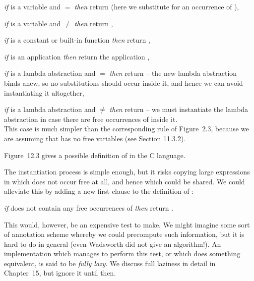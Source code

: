 \begin{numbered}
    \item \textit{if}  is a variable  and  $=$  \textit{then} return  (here we substitute
     for an occurrence of ),
    \item \textit{if}  is a variable  and  $\neq$  \textit{then} return ,
    \item \textit{if}  is a constant or built-in function \textit{then} return ,
    \item \textit{if}  is an application  \textit{then} return the application
    ,
    \item \textit{if}  is a lambda abstraction  and  $=$  \textit{then} return  -- the
    new lambda abstraction binds  anew, so no substitutions should occur
    inside it, and hence we can avoid instantiating it altogether,
    \item \textit{if}  is a lambda abstraction  and  $\neq$  \textit{then} return
     -- we must instantiate the lambda abstraction
    in case there are free occurrences of  inside it.\\
    This case is much simpler than the corresponding rule of Figure~2.3,
    because we are assuming that  has no free variables (see Section
    11.3.2).
\end{numbered}

Figure~12.3 gives a possible definition of  in the C language.

The instantiation process is simple enough, but it risks copying large
expressions in which  does not occur free at all, and hence which could be
shared. We could alleviate this by adding a new first clause to the definition of
:

\vs
\indent \textit{if}  does not contain any free occurrences of  \textit{then} return .
\vs

\noindent This would, however, be an expensive test to make. We might imagine some
sort of annotation scheme whereby we could precompute such information,
but it is hard to do in general (even Wadsworth did not give an algorithm!).
An implementation which manages to perform this test, or which does
something equivalent, is said to be \textit{fully lazy}. We discuss full laziness in detail
in Chapter~15, but ignore it until then.

